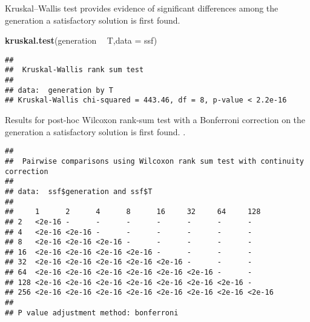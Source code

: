 \documentclass[]{book}
\newenvironment{Shaded}{\begin{snugshade}}{\end{snugshade}}
\newcommand{\DataTypeTok}[1]{\textcolor[rgb]{0.13,0.29,0.53}{#1}}
\newcommand{\KeywordTok}[1]{\textcolor[rgb]{0.13,0.29,0.53}{\textbf{#1}}}
\newcommand{\NormalTok}[1]{#1}
\newcommand{\OperatorTok}[1]{\textcolor[rgb]{0.81,0.36,0.00}{\textbf{#1}}}
\newcommand{\OtherTok}[1]{\textcolor[rgb]{0.56,0.35,0.01}{#1}}
\newcommand{\StringTok}[1]{\textcolor[rgb]{0.31,0.60,0.02}{#1}}
\begin{document}
Kruskal--Wallis test provides evidence of significant differences among the generation a satisfactory solution is first found.

\begin{Shaded}
\begin{Highlighting}[]
\KeywordTok{kruskal.test}\NormalTok{(generation }\OperatorTok{~}\StringTok{ }\NormalTok{T,}\DataTypeTok{data =}\NormalTok{ ssf)}
\end{Highlighting}
\end{Shaded}

\begin{verbatim}
## 
##  Kruskal-Wallis rank sum test
## 
## data:  generation by T
## Kruskal-Wallis chi-squared = 443.46, df = 8, p-value < 2.2e-16
\end{verbatim}

Results for post-hoc Wilcoxon rank-sum test with a Bonferroni correction on the generation a satisfactory solution is first found. .

\begin{Shaded}
\end{Shaded}

\begin{verbatim}
## 
##  Pairwise comparisons using Wilcoxon rank sum test with continuity correction 
## 
## data:  ssf$generation and ssf$T 
## 
##     1      2      4      8      16     32     64     128   
## 2   <2e-16 -      -      -      -      -      -      -     
## 4   <2e-16 <2e-16 -      -      -      -      -      -     
## 8   <2e-16 <2e-16 <2e-16 -      -      -      -      -     
## 16  <2e-16 <2e-16 <2e-16 <2e-16 -      -      -      -     
## 32  <2e-16 <2e-16 <2e-16 <2e-16 <2e-16 -      -      -     
## 64  <2e-16 <2e-16 <2e-16 <2e-16 <2e-16 <2e-16 -      -     
## 128 <2e-16 <2e-16 <2e-16 <2e-16 <2e-16 <2e-16 <2e-16 -     
## 256 <2e-16 <2e-16 <2e-16 <2e-16 <2e-16 <2e-16 <2e-16 <2e-16
## 
## P value adjustment method: bonferroni
\end{verbatim}
\end{document}
